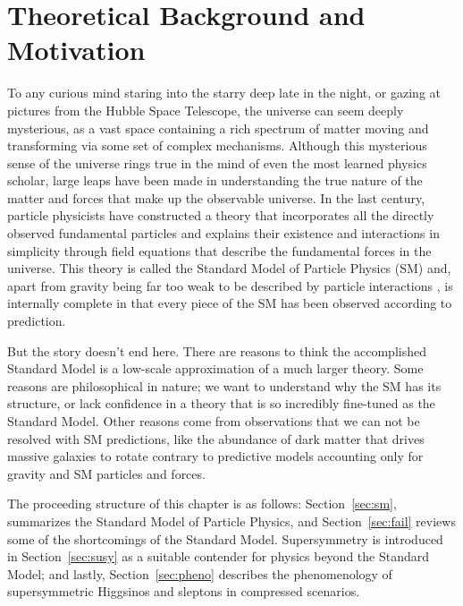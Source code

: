 \chapter{Theoretical Background and Motivation}
\label{ch:thy}
To any curious mind staring into the starry deep late in the night, or gazing at pictures from the Hubble Space Telescope, the universe can seem deeply mysterious, as a vast space containing a rich spectrum of matter moving and transforming via some set of complex mechanisms.  Although this mysterious sense of the universe rings true in the mind of even the most learned physics scholar, large leaps have been made in understanding the true nature of the matter and forces that make up the observable universe.   In the last century, particle physicists have constructed a theory that incorporates all the directly observed fundamental particles and explains their existence and interactions in simplicity through field equations that describe the fundamental forces in the universe.  This theory is called the Standard Model of Particle Physics (SM) and, apart from gravity being far too weak to be described by particle interactions \cite{Chalmers:2002wu}, is internally complete in that every piece of the SM has been observed according to prediction.

But the story doesn't end here.  There are reasons to think the accomplished Standard Model is a low-scale approximation of a much larger theory.  Some reasons are philosophical in nature; we want to understand why the SM has its structure, or lack confidence in a theory that is so incredibly fine-tuned as the Standard Model.  Other reasons come from observations that we can not be resolved with SM predictions, like the abundance of dark matter that drives massive galaxies to rotate contrary to predictive models accounting only for gravity and SM particles and forces.

The proceeding structure of this chapter is as follows: Section~\ref{sec:sm}, summarizes the Standard Model of Particle Physics, and Section~\ref{sec:fail} reviews some of the shortcomings of the Standard Model.  Supersymmetry is introduced in Section~\ref{sec:susy} as a suitable contender for physics beyond the Standard Model; and lastly, Section~\ref{sec:pheno} describes the phenomenology of supersymmetric Higgsinos and sleptons in compressed scenarios.

